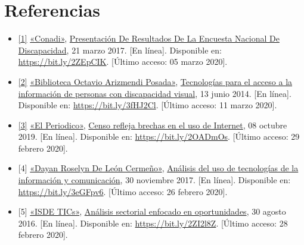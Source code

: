 \documentclass[12pt,spanish,Letterpaper,openany]{book}
\newcommand{\spaceminusmilis}{\vspace{-0.5mm}}
\begin{document}
\hypertarget{referencias-4}{%
\section*{Referencias}\label{referencias-4}}

\begin{itemize}
\item
  \hypertarget{articulo05_ref01}{}

  \protect\hyperlink{articulo05_cross01}{{[}1{]}} \href{http://conadi.gob.gt/}{«Conadi»}, \href{http://conadi.gob.gt/web/2017/03/21/presentacion-de-resultados-de-la-encuesta-nacional-de-discapacidad/}{Presentación De Resultados De La Encuesta Nacional De Discapacidad}, 21 marzo 2017. {[}En línea{]}. Disponible en: \url{https://bit.ly/2ZEpCIK}. {[}Último acceso: 05 marzo 2020{]}.
  \spaceminusmilis
\item
  \hypertarget{articulo05_ref02}{}

  \protect\hyperlink{articulo05_cross02}{{[}2{]}} \href{https://bibliosabana.wordpress.com/}{«Biblioteca Octavio Arizmendi Posada»}, \href{https://bibliosabana.wordpress.com/2014/06/13/tecnologias-para-el-acceso-a-la-informacion-de-personas-con-discapacidad-visual/}{Tecnologías para el acceso a la información de personas con discapacidad visual}, 13 junio 2014. {[}En línea{]}. Disponible en: \url{https://bit.ly/3fHJ2Cl}. {[}Último acceso: 11 marzo 2020{]}.
  \spaceminusmilis
\item
  \hypertarget{articulo05_ref03}{}

  \protect\hyperlink{articulo05_cross03}{{[}3{]}} \href{https://elperiodico.com.gt/}{«El Periodico»}, \href{https://elperiodico.com.gt/inversion/2019/10/08/censo-refleja-brechas-en-el-uso-de-internet/}{Censo refleja brechas en el uso de Internet}, 08 octubre 2019. {[}En línea{]}. Disponible en: \url{https://bit.ly/2OADmOs}. {[}Último acceso: 29 febrero 2020{]}.
  \spaceminusmilis
\item
  \hypertarget{articulo05_ref04}{}

  {[}4{]} \href{http://polidoc.usac.edu.gt}{«Dayan Roselyn De León Cermeño»}, \href{http://polidoc.usac.edu.gt/digital/cedec11272.pdf}{Análisis del uso de tecnologías de la información y comunicación}, 30 noviembre 2017. {[}En línea{]}. Disponible en: \url{https://bit.ly/3eGFpv6}. {[}Último acceso: 26 febrero 2020{]}.
  \spaceminusmilis
\item
  \hypertarget{articulo05_ref05}{}

  {[}5{]} \href{https://aspace.org/}{«ISDE TICs»}, \href{https://aspace.org/blog/705/control-de-entorno}{Análisis sectorial enfocado en oportunidades}, 30 agosto 2016. {[}En línea{]}. Disponible en: \url{https://bit.ly/2ZI2l8Z}. {[}Último acceso: 28 febrero 2020{]}.
\end{itemize}
\end{document}
